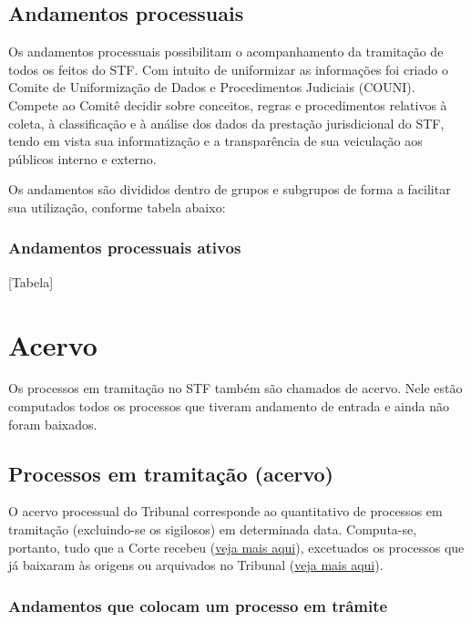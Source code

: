 \documentclass[
]{book}
\theoremstyle{definition}
\theoremstyle{definition}
\theoremstyle{definition}
\theoremstyle{definition}
\theoremstyle{remark}
\begin{document}
\hypertarget{andamentos-processuais}{%
\section{Andamentos processuais}\label{andamentos-processuais}}

Os andamentos processuais possibilitam o acompanhamento da tramitação de todos os feitos do STF. Com intuito de uniformizar as informações foi criado o Comite de Uniformização de Dados e Procedimentos Judiciais (COUNI). Compete ao Comitê decidir sobre conceitos, regras e procedimentos relativos à coleta, à classificação e à análise dos dados da prestação jurisdicional do STF, tendo em vista sua informatização e a transparência de sua veiculação aos públicos interno e externo.

Os andamentos são divididos dentro de grupos e subgrupos de forma a facilitar sua utilização, conforme tabela abaixo:

\hypertarget{andamentos-processuais-ativos}{%
\subsection{Andamentos processuais ativos}\label{andamentos-processuais-ativos}}

{[}Tabela{]}

\hypertarget{acervo}{%
\chapter{Acervo}\label{acervo}}

Os processos em tramitação no STF também são chamados de acervo. Nele estão computados todos os processos que tiveram andamento de entrada e ainda não foram baixados.

\hypertarget{processos-em-tramitauxe7uxe3o-acervo}{%
\section{Processos em tramitação (acervo)}\label{processos-em-tramitauxe7uxe3o-acervo}}

O acervo processual do Tribunal corresponde ao quantitativo de processos em tramitação (excluindo-se os sigilosos) em determinada data. Computa-se, portanto, tudo que a Corte recebeu (\protect\hyperlink{recebimento}{veja mais aqui}), excetuados os processos que já baixaram às origens ou arquivados no Tribunal (\protect\hyperlink{baixados}{veja mais aqui}).

\hypertarget{andamentos-que-colocam-um-processo-em-truxe2mite}{%
\subsection{Andamentos que colocam um processo em trâmite}\label{andamentos-que-colocam-um-processo-em-truxe2mite}}
\end{document}
